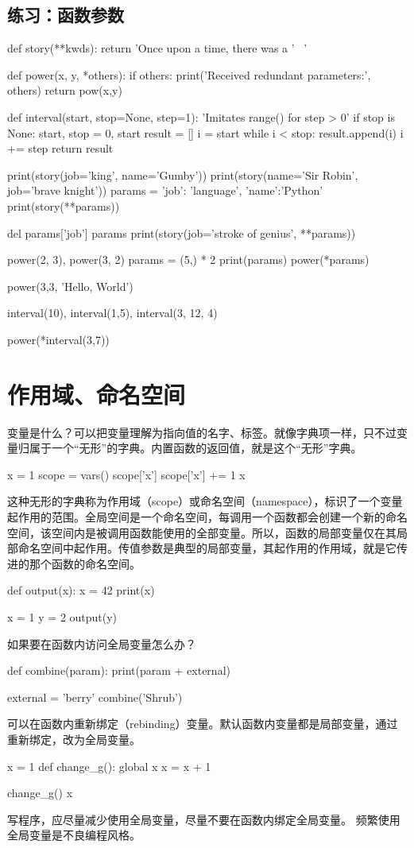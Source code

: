 \subsection{练习：函数参数}
\begin{python}
def story(**kwds):
    return 'Once upon a time, there was a ' \
    '%

def power(x, y, *others):
    if others:
        print('Received redundant parameters:', others)
    return pow(x,y)

def interval(start, stop=None, step=1):
    'Imitates range() for step > 0'
    if stop is None:
        start, stop = 0, start
    result = []
    i = start
    while i < stop:
        result.append(i)
        i += step
    return result

print(story(job='king', name='Gumby'))
print(story(name='Sir Robin', job='brave knight'))
params = {'job': 'language', 'name':'Python'}
print(story(**params))

del params['job']
params
print(story(job='stroke of genius', **params))

power(2, 3), power(3, 2)
params = (5,) * 2
print(params)
power(*params)

power(3,3, 'Hello, World')

interval(10), interval(1,5), interval(3, 12, 4)

power(*interval(3,7))
\end{python}

\section{作用域、命名空间}
变量是什么？可以把变量理解为指向值的名字、标签。就像字典项一样，只不过变量归属于一个“无形”的字典。内置函数的返回值，就是这个“无形”字典。
\begin{python}
x = 1
scope = vars()
scope['x']
scope['x'] += 1
x
\end{python}
这种无形的字典称为作用域（scope）或命名空间（namespace），标识了一个变量起作用的范围。全局空间是一个命名空间，每调用一个函数都会创建一个新的命名空间，该空间内是被调用函数能使用的全部变量。所以，函数的局部变量仅在其局部命名空间中起作用。传值参数是典型的局部变量，其起作用的作用域，就是它传进的那个函数的命名空间。
\begin{python}
def output(x):
    x = 42
    print(x)

x = 1
y = 2
output(y)
\end{python}
如果要在函数内访问全局变量怎么办？
\begin{python}
  def combine(param):
      print(param + external)

  external = 'berry'
  combine('Shrub')
\end{python}
可以在函数内重新绑定（rebinding）变量。默认函数内变量都是局部变量，通过重新绑定，改为全局变量。
\begin{python}
x = 1
def change_g():
    global x  
    x = x + 1

change_g()
x
\end{python}
写程序，应尽量减少使用全局变量，尽量不要在函数内绑定全局变量。 频繁使用全局变量是不良编程风格。
